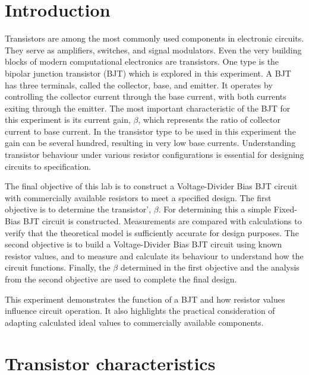 \documentclass{article}
\begin{document}
\section{Introduction}
Transistors are among the most commonly used components in electronic circuits. They serve as amplifiers, switches, and signal modulators.
Even the very building blocks of modern computational electronics are transistors.
One type is the bipolar junction transistor (BJT) which is explored in this experiment.
A BJT has three terminals, called the collector, base, and emitter.
It operates by controlling the collector current through the base current, with both currents exiting through the emitter.
The most important characteristic of the BJT for this experiment is its current gain, \(\beta\), which represents the ratio of collector current to base current.
In the transistor type to be used in this experiment the gain can be several hundred, resulting in very low base currents.
Understanding transistor behaviour under various resistor configurations is essential for designing circuits to specification.

The final objective of this lab is to construct a Voltage-Divider Bias BJT circuit with commercially available resistors to meet a specified design.
The first objective is to determine the transistor', \(\beta\).
For determining this a simple Fixed-Bias BJT circuit is constructed.
Measurements are compared with calculations to verify that the theoretical model is sufficiently accurate for design purposes.
The second objective is to build a Voltage-Divider Bias BJT circuit using known resistor values, and to measure and calculate its behaviour to understand how the circuit functions.
Finally, the \(\beta\) determined in the first objective and the analysis from the second objective are used to complete the final design.

This experiment demonstrates the function of a BJT and how resistor values influence circuit operation.
It also highlights the practical consideration of adapting calculated ideal values to commercially available components.


\section{Transistor characteristics}

\end{document}
